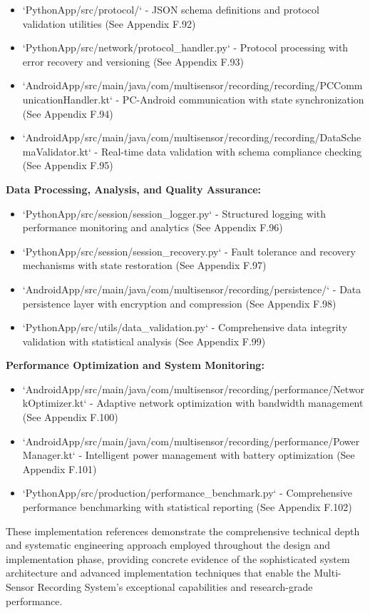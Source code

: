 \documentclass[12pt,a4paper]{article}
\begin{document}
\begin{itemize}
\item `PythonApp/src/protocol/` - JSON schema definitions and protocol validation utilities (See Appendix F.92)
\item `PythonApp/src/network/protocol_handler.py` - Protocol processing with error recovery and versioning (See Appendix
  F.93)
\item `AndroidApp/src/main/java/com/multisensor/recording/recording/PCCommunicationHandler.kt` - PC-Android communication
  with state synchronization (See Appendix F.94)
\item `AndroidApp/src/main/java/com/multisensor/recording/recording/DataSchemaValidator.kt` - Real-time data validation with
  schema compliance checking (See Appendix F.95)

\end{itemize}
\textbf{Data Processing, Analysis, and Quality Assurance:}

\begin{itemize}
\item `PythonApp/src/session/session_logger.py` - Structured logging with performance monitoring and analytics (See Appendix
  F.96)
\item `PythonApp/src/session/session_recovery.py` - Fault tolerance and recovery mechanisms with state restoration (See
  Appendix F.97)
\item `AndroidApp/src/main/java/com/multisensor/recording/persistence/` - Data persistence layer with encryption and
  compression (See Appendix F.98)
\item `PythonApp/src/utils/data_validation.py` - Comprehensive data integrity validation with statistical analysis (See
  Appendix F.99)

\end{itemize}
\textbf{Performance Optimization and System Monitoring:}

\begin{itemize}
\item `AndroidApp/src/main/java/com/multisensor/recording/performance/NetworkOptimizer.kt` - Adaptive network optimization
  with bandwidth management (See Appendix F.100)
\item `AndroidApp/src/main/java/com/multisensor/recording/performance/PowerManager.kt` - Intelligent power management with
  battery optimization (See Appendix F.101)
\item `PythonApp/src/production/performance_benchmark.py` - Comprehensive performance benchmarking with statistical
  reporting (See Appendix F.102)

\end{itemize}
These implementation references demonstrate the comprehensive technical depth and systematic engineering approach
employed throughout the design and implementation phase, providing concrete evidence of the sophisticated system
architecture and advanced implementation techniques that enable the Multi-Sensor Recording System's exceptional
capabilities and research-grade performance.
\end{document}
